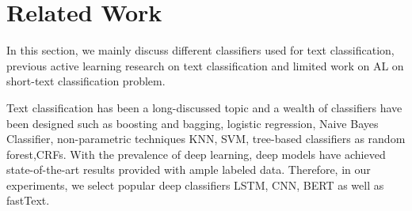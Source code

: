 \section{Related Work}
\label{sec:related}





In this section, we mainly discuss different classifiers used for text classification,  previous active learning research on text classification and limited work on AL on short-text classification problem. 

Text classification has been a long-discussed topic and a wealth of classifiers have been designed such as boosting and bagging\cite{opitz1999popular}, logistic regression\cite{walker1967estimation}, Naive Bayes Classifier\cite{rish2001empirical}, non-parametric techniques KNN\cite{altman1992introduction}, SVM\cite{cortes1995support}, tree-based classifiers as random forest\cite{ho1995random},CRFs\cite{lafferty2001conditional}. With the prevalence of deep learning, deep models have achieved state-of-the-art results provided with ample labeled data. Therefore, in our experiments, we select popular deep classifiers LSTM\cite{hochreiter1997long}, CNN\cite{kim2014convolutional}, BERT\cite{devlin2018bert} as well as fastText\cite{joulin2016bag}.


